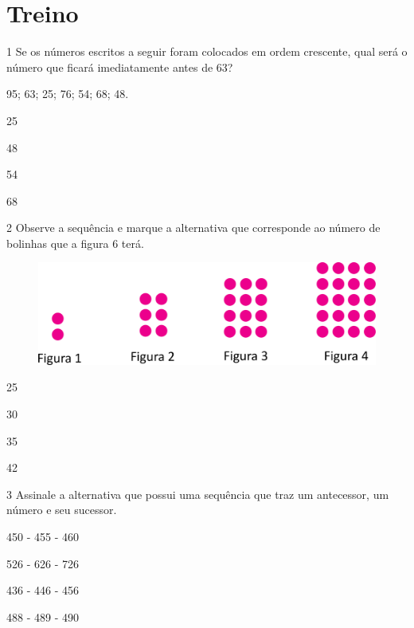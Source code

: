\section*{Treino}

\num{1} Se os números escritos a seguir foram colocados em ordem crescente, qual
será o número que ficará imediatamente antes de 63?

\begin{myquote}
95; 63; 25; 76; 54; 68; 48.
\end{myquote}

\begin{escolha}

\item
  25
\item
  48
\item
  54
\item
  68
\end{escolha}

\num{2} Observe a sequência e marque a alternativa que corresponde ao número de bolinhas que a figura 6 terá.

\begin{figure}[htpb!]
\includegraphics[width=\textwidth]{./media/image37.png}
\end{figure}

\begin{escolha}
\item
  25
\item
  30
\item
  35
\item
  42
\end{escolha}




\num{3} Assinale a alternativa que possui uma sequência que traz um antecessor, um número e seu sucessor.

\begin{escolha}
\item 450 - 455 - 460

\item 526 - 626 - 726

\item 436 - 446 - 456

\item 488 - 489 - 490
\end{escolha}

